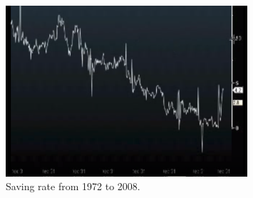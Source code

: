 \begin{figure}[h!]
\centering
\includegraphics[width=0.8\textwidth]{images/savings.png}
\caption{Saving rate from 1972 to 2008.}
\label{fig:saving_rate}
\end{figure}
